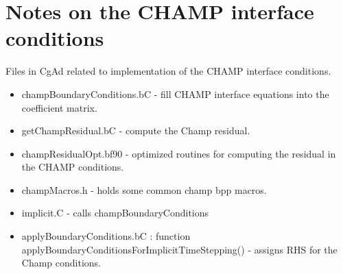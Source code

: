 \section{Notes on the CHAMP interface conditions} \label{sec:champNotes}

Files in CgAd related to implementation of the CHAMP interface conditions.
\begin{itemize}
  \item champBoundaryConditions.bC - fill CHAMP interface equations into the coefficient matrix.
  \item getChampResidual.bC - compute the Champ residual.
  \item champResidualOpt.bf90 - optimized routines for computing the residual in the CHAMP conditions.
  \item champMacros.h - holds some common champ bpp macros.
  \item implicit.C - calls champBoundaryConditions
  \item applyBoundaryConditions.bC : function applyBoundaryConditionsForImplicitTimeStepping() - assigns RHS for
      the Champ conditions.
\end{itemize}